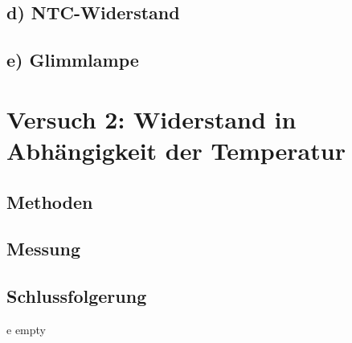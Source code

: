 \documentclass[11pt,a4paper,titlepage, ngerman]{article}
\begin{document}
		\subsection{d) NTC-Widerstand} %

		\subsection{e) Glimmlampe} %

	\section{Versuch 2: Widerstand in Abhängigkeit der Temperatur}		

		\subsection{Methoden} %
		
		\subsection{Messung}
		
		\subsection{Schlussfolgerung}		
	
	\newpage	
	\begin{thebibliography}	
		e empty
	\end{thebibliography}	
			
\end{document}
